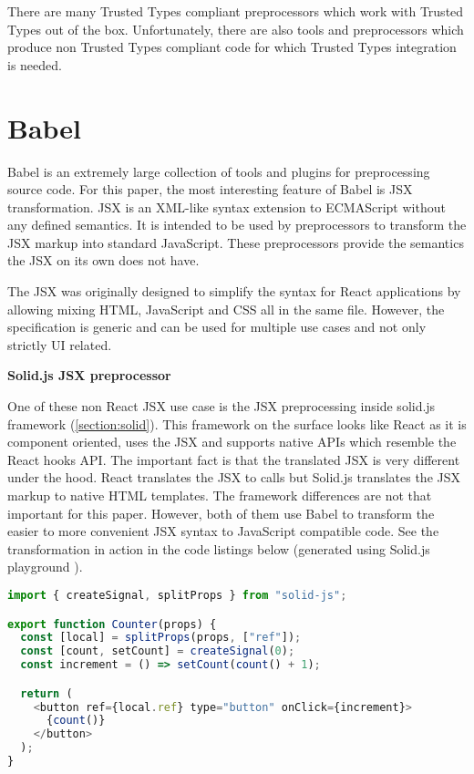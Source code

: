 There are many Trusted Types compliant preprocessors which work with Trusted Types out of the box.
Unfortunately, there are also tools and preprocessors which produce non Trusted Types compliant code
for which Trusted Types integration is needed.

\section{Babel}

Babel is an extremely large collection of tools and plugins for preprocessing source code. For this
paper, the most interesting feature of Babel is JSX transformation. JSX is an XML-like syntax
extension to ECMAScript without any defined semantics. It is intended to be used by preprocessors to
transform the JSX markup into standard JavaScript. These preprocessors provide the semantics the JSX
on its own does not have.

The JSX was originally designed to simplify the syntax for React applications by allowing mixing
HTML, JavaScript and CSS all in the same file. However, the specification \cite{jsx_spec} is
generic and can be used for multiple use cases and not only strictly UI related.

\medskip
\begin{flushleft}\textbf {Solid.js JSX preprocessor}\end{flushleft}
\medskip
\label{jsx_solid_preprocessor}

One of these non React JSX use case is the JSX preprocessing inside solid.js framework
(\ref{section:solid}). This framework on the surface looks like React as it is component oriented,
uses the JSX and supports native APIs which resemble the React hooks API. The important fact is that
the translated JSX is very different under the hood. React translates the JSX to
 calls but Solid.js translates the JSX markup to native HTML templates.
The framework differences are not that important for this paper. However, both of them use Babel to
transform the easier to more convenient JSX syntax to JavaScript compatible code. See the
transformation in action in the code listings below (generated using Solid.js playground
\cite{solidjs_playground}).

\bigskip
\begin{lstlisting}[language=JavaScript, caption=Example of a component in Solid.js using JSX]
import { createSignal, splitProps } from "solid-js";

export function Counter(props) {
  const [local] = splitProps(props, ["ref"]);
  const [count, setCount] = createSignal(0);
  const increment = () => setCount(count() + 1);

  return (
    <button ref={local.ref} type="button" onClick={increment}>
      {count()}
    </button>
  );
}
\end{lstlisting}

